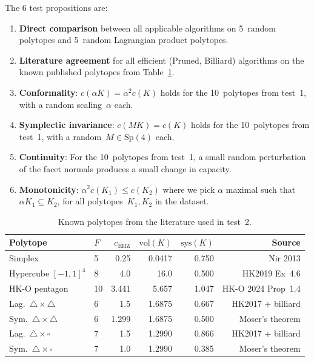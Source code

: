 The 6 test propositions are:
\begin{enumerate}
  \item \textbf{Direct comparison} between all applicable algorithms on
    5~random polytopes and 5~random Lagrangian product polytopes.

  \item \textbf{Literature agreement} for all efficient (Pruned, Billiard)
    algorithms on the known published polytopes from
    Table~\ref{tab:literature-polytopes}.

  \item \textbf{Conformality}: $c(\alpha K) = \alpha^2 c(K)$ holds for the
    10~polytopes from test~1, with a random scaling~$\alpha$ each.

  \item \textbf{Symplectic invariance}: $c(MK) = c(K)$ holds for the
    10~polytopes from test~1, with a random~$M \in \mathrm{Sp}(4)$ each.

  \item \textbf{Continuity}: For the 10~polytopes from test~1, a small
    random perturbation of the facet normals produces a small change in
    capacity.

  \item \textbf{Monotonicity}: $\alpha^2 c(K_1) \le c(K_2)$ where we pick
    $\alpha$ maximal such that~$\alpha K_1 \subseteq K_2$, for all
    polytopes~$K_1, K_2$ in the dataset.
\end{enumerate}

\begin{table}[h]
\centering
\small
\begin{tabular}{llrrrr}
\toprule
Polytope & $F$ & $c_{\mathrm{EHZ}}$ & $\mathrm{vol}(K)$ & $\mathrm{sys}(K)$ & Source \\
\midrule
Simplex & 5 & 0.25 & 0.0417 & 0.750 & Nir 2013 \\
Hypercube $[-1,1]^4$ & 8 & 4.0 & 16.0 & 0.500 & HK2019 Ex~4.6 \\
HK-O pentagon & 10 & 3.441 & 5.657 & 1.047 & HK-O 2024 Prop~1.4 \\
Lag.\ $\triangle \times \triangle$ & 6 & 1.5 & 1.6875 & 0.667 & HK2017 + billiard \\
Sym.\ $\triangle \times \triangle$ & 6 & 1.299 & 1.6875 & 0.500 & Moser's theorem \\
Lag.\ $\triangle \times \square$ & 7 & 1.5 & 1.2990 & 0.866 & HK2017 + billiard \\
Sym.\ $\triangle \times \square$ & 7 & 1.0 & 1.2990 & 0.385 & Moser's theorem \\
\bottomrule
\end{tabular}
\caption{Known polytopes from the literature used in test~2.}
\label{tab:literature-polytopes}
\end{table}
